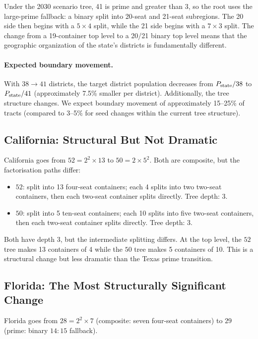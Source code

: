 Under the 2030 scenario tree, 41 is prime and greater than 3, so the root
uses the large-prime fallback: a binary split into 20-seat and 21-seat
subregions.  The 20 side then begins with a $5\times4$ split, while the
21 side begins with a $7\times3$ split.  The change from a 19-container
top level to a 20/21 binary top level means that the geographic organization
of the state's districts is fundamentally different.

\paragraph{Expected boundary movement.}
With $38 \to 41$ districts, the target district population decreases
from $P_{\rm state}/38$ to $P_{\rm state}/41$ (approximately 7.5\%
smaller per district).
Additionally, the tree structure changes.
We expect boundary movement of approximately 15--25\% of tracts
(compared to 3--5\% for seed changes within the current tree structure).

\subsection{California: Structural But Not Dramatic}

California goes from $52 = 2^2 \times 13$ to $50 = 2 \times 5^2$.
Both are composite, but the factorisation paths differ:
\begin{itemize}
\item $52$: split into 13 four-seat containers; each 4 splits into two
      two-seat containers, then each two-seat container splits directly.
      Tree depth: 3.
\item $50$: split into 5 ten-seat containers; each 10 splits into five
      two-seat containers, then each two-seat container splits directly.
      Tree depth: 3.
\end{itemize}

Both have depth 3, but the intermediate splitting differs.
At the top level, the $52$ tree makes 13 containers of 4 while the $50$ tree
makes 5 containers of 10.
This is a structural change but less dramatic than the Texas prime transition.

\subsection{Florida: The Most Structurally Significant Change}

Florida goes from $28 = 2^2 \times 7$ (composite: seven four-seat containers)
to $29$ (prime: binary $14:15$ fallback).

